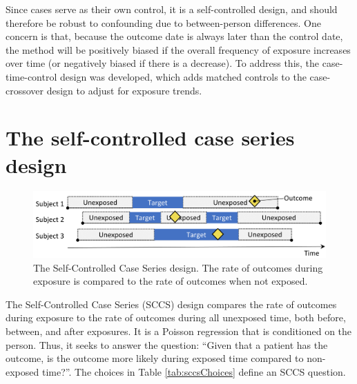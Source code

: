 \documentclass[11pt]{book}
\begin{document}
Since cases serve as their own control, it is a self-controlled design,
and should therefore be robust to confounding due to between-person
differences. One concern is that, because the outcome date is always
later than the control date, the method will be positively biased if the
overall frequency of exposure increases over time (or negatively biased
if there is a decrease). To address this, the case-time-control design
\citep{suissa_1995} was developed, which adds matched controls to the
case-crossover design to adjust for exposure trends.

\section{The self-controlled case series
design}\label{the-self-controlled-case-series-design}

\begin{figure}

{\centering \includegraphics[width=0.9\linewidth]{images/PopulationLevelEstimation/selfControlledCaseSeries} 

}

\caption{The Self-Controlled Case Series design. The rate of outcomes during exposure is compared to the rate of outcomes when not exposed.}\label{fig:selfControlledCaseSeries}
\end{figure}

The Self-Controlled Case Series (SCCS) design
\citep[whitaker\_2006]{farrington_1995} compares the rate of outcomes
during exposure to the rate of outcomes during all unexposed time, both
before, between, and after exposures. It is a Poisson regression that is
conditioned on the person. Thus, it seeks to answer the question:
``Given that a patient has the outcome, is the outcome more likely
during exposed time compared to non-exposed time?''. The choices in
Table \ref{tab:sccsChoices} define an SCCS question.
\end{document}
